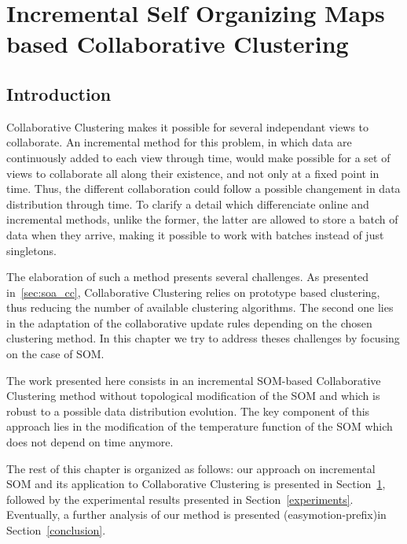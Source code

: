 	\chapter{Incremental Self Organizing Maps based Collaborative Clustering}
\label{ccisom}

    \section{Introduction}
    Collaborative Clustering makes it possible for several independant views to collaborate. An incremental method for this problem, in which data are continuously added to each view through time, would make possible for a set of views to collaborate all along their existence, and not only at a fixed point in time. Thus, the different collaboration could follow a possible changement in data distribution through time. To clarify a detail which differenciate online and incremental methods, unlike the former, the latter are allowed to store a batch of data when they arrive, making it possible to work with batches instead of just singletons.
	
    The elaboration of such a method presents several challenges. As presented in~\ref{sec:soa_cc}, Collaborative Clustering relies on prototype based clustering, thus reducing the number of available clustering algorithms. The second one lies in the adaptation of the collaborative update rules depending on the chosen clustering method. In this chapter we try to address theses challenges by focusing on the case of SOM.\@
	
    The work presented here consists in an incremental SOM-based Collaborative Clustering method without topological modification of the SOM and which is robust to a possible data distribution evolution. The key component of this approach lies in the modification of the temperature function of the SOM which does not depend on time anymore.
	
    The rest of this chapter is organized as follows: our approach on incremental SOM and its application to Collaborative Clustering is presented in Section~\ref{ccisom}, followed by the experimental results presented in Section~\ref{experiments}. Eventually, a further analysis of our method is presented (easymotion-prefix)in Section~\ref{conclusion}.
	

